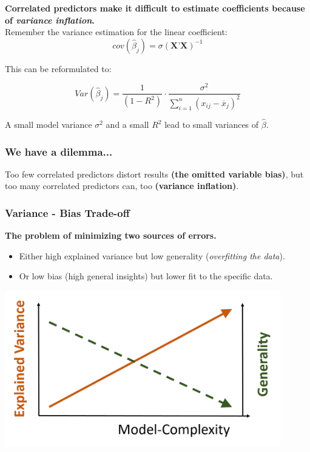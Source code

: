 \documentclass{beamer}
\begin{document}
\begin{frame}
  \frametitle{}
  \textbf{Correlated predictors make it difficult to estimate coefficients because of \textit{variance inflation}.}
  \\
  Remember the variance estimation for the linear coefficient:
  \begin{equation*}
      cov(\hat{\beta}_j) = \sigma(\textbf{X'X})^{-1}
  \end{equation*}

  This can be reformulated to:
  
  \begin{equation*}
    Var(\hat{\beta}_j) = \frac{1}{(1-R^2)} \cdot \frac{\sigma^2}{\sum_{i=1}^{n} (x_{ij} - \overline{x}_j)^2}
  \end{equation*}
  
  A small model variance $\sigma^2$ and a small $R^2$ lead to small variances of $\hat{\beta}$.
\end{frame}

\begin{frame}
    \frametitle{We have a dilemma...}
    \large{Too few correlated predictors distort results \textbf{(the omitted variable bias)}, but too many correlated predictors can, too \textbf{(variance inflation)}.}
\end{frame}

\begin{frame}
  \frametitle{Variance - Bias Trade-off}
  \textbf{The problem of minimizing two sources of errors.}
  
  \begin{itemize}
    \item Either high explained variance but low generality (\textit{overfitting the data}).
    \item Or low bias (high general insights) but lower fit to the specific data.
  \end{itemize}
  
  \begin{center}
    \includegraphics[width=0.9\textwidth]{figures/var-bias-tradeoff.png} 
  \end{center}
\end{frame}
\end{document}
